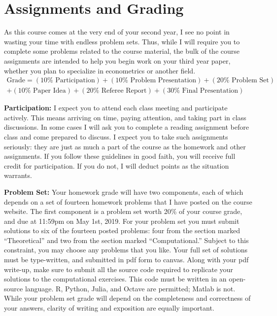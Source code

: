 \documentclass[11pt, letterpaper]{article}
\begin{document}
\medskip

\section*{Assignments and Grading}
As this course comes at the very end of your second year, I see no point in wasting your time with endless problem sets.
Thus, while I will require you to complete some problems related to the course material, the bulk of the course assignments are intended to help you begin work on your third year paper, whether you plan to specialize in econometrics or another field.
	\begin{equation*}
    \begin{split}
    \mbox{Grade} = (10\% \text{ Participation}) + (10\% \text{ Problem Presentation}) + (20\% \text{ Problem Set})\\
    + (10\% \text{ Paper Idea}) + (20\% \text{ Referee Report}) + (30\% \text{ Final Presentation})
    \end{split}
	\end{equation*}

\noindent \textbf{Participation:} 
I expect you to attend each class meeting and participate actively.
This means arriving on time, paying attention, and taking part in class discussions.
In some cases I will ask you to complete a reading assignment before class and come prepared to discuss.
I expect you to take such assignments seriously: they are just as much a part of the course as the homework and other assignments.
If you follow these guidelines in good faith, you will receive full credit for participation.
If you do not, I will deduct points as the situation warrants.

\medskip

\noindent \textbf{Problem Set:} 
Your homework grade will have two components, each of which depends on a set of fourteen homework problems that I have posted on the course website.
The first component is a problem set worth 20\% of your course grade, and due at 11:59pm on May 1st, 2019.
For your problem set you must submit solutions to six of the fourteen posted problems: four from the section marked ``Theoretical'' and two from the section marked ``Computational.''
Subject to this constraint, you may choose any problems that you like. 
Your full set of solutions must be type-written, and submitted in pdf form to
canvas. 
Along with your pdf write-up, make sure to submit all the source code required to replicate your solutions to the computational exercises. 
This code must be written in an open-source language. 
R, Python, Julia, and Octave are permitted; Matlab is not.
While your problem set grade will depend on the completeness and correctness of your answers, clarity of writing and exposition are equally important. 
\end{document}

